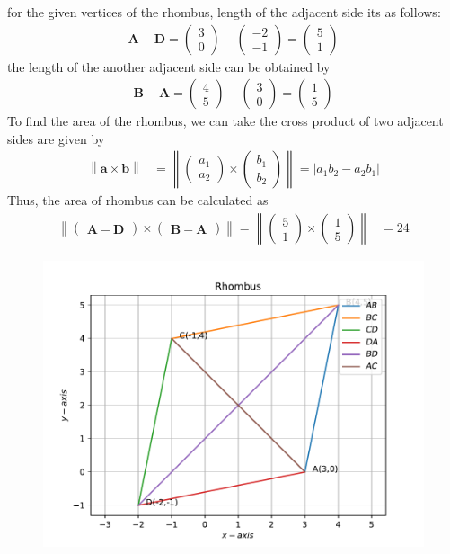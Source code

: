 \documentclass[12pt]{article}
\providecommand{\norm}[1]{\left\lVert#1\right\rVert}
\newcommand{\myvec}[1]{\ensuremath{\begin{pmatrix}#1\end{pmatrix}}}
\let\vec\mathbf
\begin{document}
\begin{enumerate}
for the given vertices of the rhombus, length of the adjacent side its as follows:
\begin{align}
 \vec{A-D}= \myvec{3 \\ 0} - \myvec{-2 \\-1}= \myvec{5\\1}
\end{align}
the length of the another adjacent side can be obtained by
\begin{align}
  \vec{B-A}= \myvec{4 \\ 5} - \myvec{3 \\0}= \myvec{1\\5}
\end{align}
To find the area of the rhombus, we can take the cross product of two adjacent sides are given by
\begin{align}
    \norm{\vec{a}\times \vec{b}} &=\norm{\myvec{a_1\\a_2} \times \myvec{b_1\\b_2}} =  \lvert a_1 b_2 - a_2 b_1 \rvert  
\end{align}
Thus, the area of rhombus can be calculated as
\begin{align}
        \norm{\myvec{\vec{A-D}}\times \myvec{\vec{B-A}}} = \norm{\myvec{5\\1} \times \myvec{1\\5}} &= 24 
\end{align}
\begin{figure}[!h]
 \begin{center}
  \includegraphics[width=\columnwidth]{figs/fig.pdf}
 \end{center}
\caption{}
\label{fig:Fig1}
\end{figure}
\end{enumerate}
\end{document}
